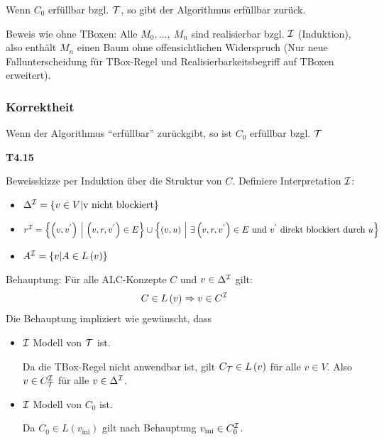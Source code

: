 \begin{proposition}
Wenn $C_0$ erfüllbar bzgl. $\mathcal{T}$, so gibt der Algorithmus erfüllbar zurück.
\end{proposition}

Beweis wie ohne TBoxen: Alle $M_{0},\ldots,\ M_{n}$ sind realisierbar
bzgl. $\mathcal{I}$ (Induktion), also enthält $M_{n}$ einen Baum ohne
offensichtlichen Widerspruch (Nur neue Fallunterscheidung für TBox-Regel und Realisierbarkeitsbegriff auf TBoxen erweitert).

\subsubsection{Korrektheit}\label{korrektheit}

\begin{proposition}
Wenn der Algorithmus ``erfüllbar'' zurückgibt, so ist $C_0$ erfüllbar bzgl. $\mathcal{T}$
\end{proposition}

\textbf{T4.15}

Beweisskizze per Induktion über die Struktur von $C$. Definiere
Interpretation $\mathcal{I}$:

\begin{itemize}
\item
  $\Delta^{\mathcal{I}} = \left\{ v \in V \middle| \text{v\ }\mathrm{\text{nicht\ blockiert}} \right\}$
\item
  $r^{\MI} = \left\{ \left( v,v^{'} \right)\  \middle| \ \left( v,r,v^{'} \right) \in E \right\} \cup \left\{ \left( v,u \right)\  \middle| \ \exists\left( v,r,v^{'} \right) \in E\mathrm{\ }\mathrm{\text{und}}\mathrm{\ }v^{'}\mathrm{\ }\mathrm{\text{direkt\ blockiert\ durch}}\mathrm{\ }u \right\}$
\item
  $A^{\mathcal{I}} = \left\{ v \middle| A \in L\left( v \right) \right\}$
\end{itemize}

Behauptung: Für alle ALC-Konzepte $C$ und $v \in \Delta^{\mathcal{I}}$ gilt:
$$C \in L\left( v \right) \Rightarrow v \in C^{\mathcal{I}}$$
Die Behauptung impliziert wie gewünscht, dass

\begin{itemize}
\item
  $\mathcal{I}$ Modell von $\mathcal{T}$ ist.

Da die TBox-Regel nicht anwendbar ist, gilt $C_{\mathcal{T}} \in L\left( v \right)$ für alle $v \in V$. Also $v \in C_{\mathcal{T}}^{\mathcal{I}}$ für alle $v \in \Delta^{\mathcal{I}}$.

\item
  $\mathcal{I}$ Modell von $C_{0}$ ist.

Da $C_{0} \in L\left( v_{\text{ini}} \right)$ gilt nach Behauptung
$v_{\text{ini}} \in C_{0}^{\mathcal{I}}$.
\end{itemize}

